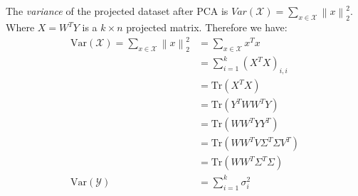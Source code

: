 \documentclass{article}
\begin{document}
The \textit{variance} of the projected dataset after PCA is $Var(\mathcal{X}) = \sum_{x \in \mathcal{X}} \left\lVert x \right\rVert^2_2$. Where $X = W^TY$ is a $k \times n$ projected matrix. Therefore we have:
\begin{equation}
    \begin{split}
        \text{Var}(\mathcal{X}) = \sum_{x \in \mathcal{X}} \left\lVert x \right\rVert^2_2 & = \sum_{x \in \mathcal{X}} x^T x         \\
                                                                                          & = \sum_{i = 1}^k (X^T X)_{i, i}          \\
                                                                                          & = \text{Tr}(X^T X)                       \\
                                                                                          & = \text{Tr}(Y^T W W^T Y)                 \\
                                                                                          & = \text{Tr}(W W^T Y Y^T)                 \\
                                                                                          & = \text{Tr}(W W^T V \Sigma^T \Sigma V^T) \\
                                                                                          & = \text{Tr}(W W^T \Sigma^T \Sigma)       \\
        \text{Var}(\mathcal{Y})                                                           & = \sum_{i = 1}^k \sigma_i^2
    \end{split}
\end{equation}
\end{document}
